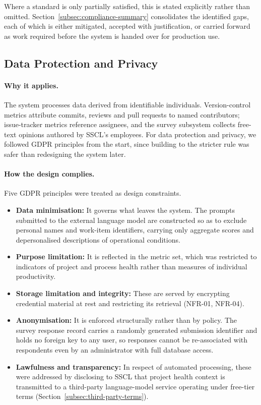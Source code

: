 Where a standard is only partially satisfied, this is stated explicitly rather
than omitted. Section~\ref{subsec:compliance-summary} consolidates the identified
gaps, each of which is either mitigated, accepted with justification, or carried
forward as work required before the system is handed over for production use.

\subsection{Data Protection and Privacy}
\label{subsec:data-protection}

\paragraph{Why it applies.}
The system processes data derived from identifiable individuals. Version-control
metrics attribute commits, reviews and pull requests to named contributors;
issue-tracker metrics reference assignees, and the survey subsystem collects
free-text opinions authored by SSCL's employees. For data protection and privacy, we followed GDPR principles from the start, since building to the stricter rule was safer than redesigning the system later.

\paragraph{How the design complies.}
Five GDPR principles were treated as design constraints. 
\begin{itemize}
  \item \textbf{Data minimisation:} It governs what leaves the system. The prompts submitted to the external language
model are constructed so as to exclude personal names and work-item identifiers,
carrying only aggregate scores and depersonalised descriptions of operational
conditions. 
  \item \textbf{Purpose limitation:} It is reflected in the metric set, which was
restricted to indicators of project and process health rather than measures of
individual productivity. 
  \item \textbf{Storage limitation and integrity:} These are served by
encrypting credential material at rest and restricting its retrieval
(NFR-01, NFR-04). 
  \item \textbf{Anonymisation:} It is enforced structurally rather than by
policy. The survey response record carries a randomly generated submission
identifier and holds no foreign key to any user, so responses cannot be
re-associated with respondents even by an administrator with full database
access. 
  \item \textbf{Lawfulness and transparency:} In respect of automated
processing, these were addressed by disclosing to SSCL that project health context
is transmitted to a third-party language-model service operating under free-tier
terms (Section~\ref{subsec:third-party-terms}).
\end{itemize}

